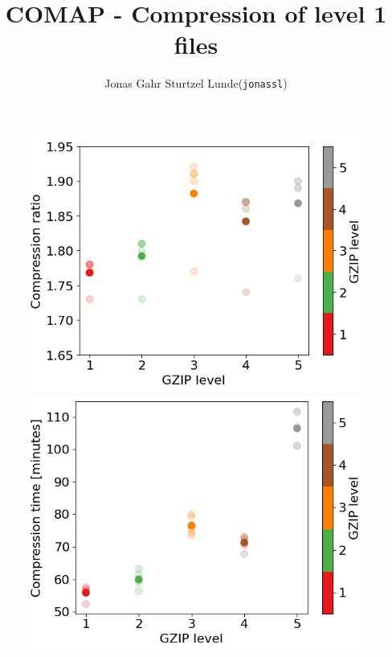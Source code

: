 \documentclass[10pt, a4paper]{article}
\begin{document}
\title{COMAP - Compression of level 1 files}
\author{
    \begin{tabular}{r l}
        Jonas Gahr Sturtzel Lunde & (\texttt{jonassl})
    \end{tabular}}

\maketitle
\begin{figure}[H]
    \centering
    \includegraphics[scale=0.55]{gzip_compratio.png}
    \includegraphics[scale=0.55]{gzip_comptime.png}
    \caption{}
    \label{}
\end{figure}
\end{document}
